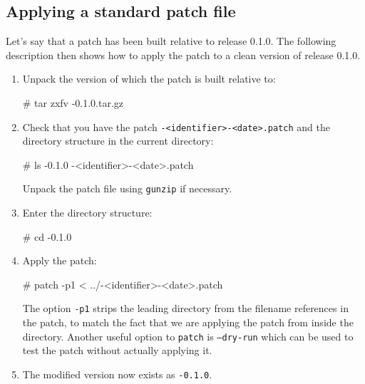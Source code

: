 \subsection{Applying a standard patch file}

Let's say that a patch has been built relative to \package{} release 0.1.0.
The following description then shows how to apply the patch to a clean
version of release 0.1.0.

\begin{enumerate}
\item
  Unpack the version of \package{} which the patch is built relative to:
  \begin{macrocode}
# tar zxfv \packagett{}-0.1.0.tar.gz
  \end{macrocode}
\item
  Check that you have the patch \texttt{\packagett{}-<identifier>-<date>.patch} and the \package{}
  directory structure in the current directory:
  \begin{macrocode}
# ls
\packagett{}-0.1.0
\packagett{}-<identifier>-<date>.patch
  \end{macrocode}
  Unpack the patch file using \texttt{gunzip} if necessary.
\item
  Enter the \package{} directory structure:
  \begin{macrocode}
# cd \packagett{}-0.1.0
  \end{macrocode}
\item
  Apply the patch:
  \begin{macrocode}
# patch -p1 < ../\packagett{}-<identifier>-<date>.patch
  \end{macrocode}
  The option \texttt{-p1} strips the leading directory from the filename
  references in the patch, to match the fact that we are applying the
  patch from inside the directory. Another useful option to
  \texttt{patch} is \texttt{--dry-run} which can be used to test the
  patch without actually applying it.
\item
  The modified version now exists as \texttt{\packagett{}-0.1.0}.
\end{enumerate}
